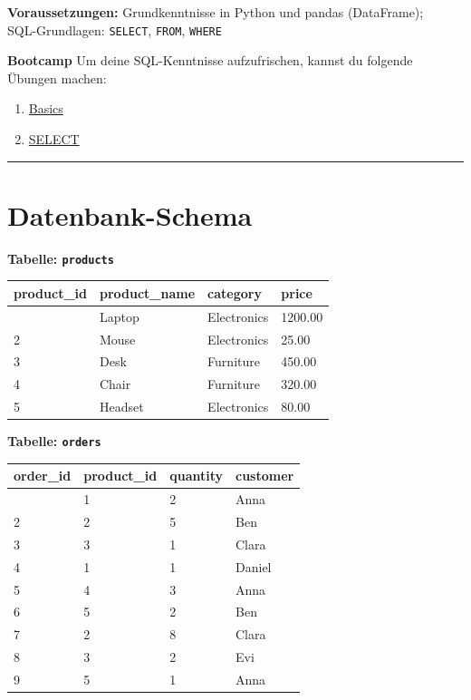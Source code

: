 \documentclass[
  nswissgerman,
  a4paper,
  DIV=11,
  numbers=noendperiod,
  ngerman]{scrreprt}
\newcounter{none} %
\providecommand{\tightlist}{%
  \setlength{\itemsep}{0pt}\setlength{\parskip}{0pt}}
\begin{document}
\textbf{Voraussetzungen:} Grundkenntnisse in Python und pandas
(DataFrame);\\
SQL-Grundlagen: \texttt{SELECT}, \texttt{FROM}, \texttt{WHERE}

\textbf{Bootcamp} Um deine SQL-Kenntnisse aufzufrischen, kannst du
folgende Übungen machen:

\begin{enumerate}
\def\labelenumi{\arabic{enumi}.}
\tightlist
\item
  \href{https://sqlzoo.net/wiki/SELECT_basics}{Basics}
\item
  \href{https://sqlzoo.net/wiki/SELECT_from_WORLD_Tutorial}{SELECT}
\end{enumerate}

\begin{center}\rule{0.5\linewidth}{0.5pt}\end{center}

\section{Datenbank-Schema}\label{datenbank-schema}

\textbf{Tabelle: \texttt{products}}

{\def\LTcaptype{none} %
\begin{longtable}[]{@{}llll@{}}
\toprule\noalign{}
product\_id & product\_name & category & price \\
\midrule\noalign{}
\endhead
\bottomrule\noalign{}
\endlastfoot
1 & Laptop & Electronics & 1200.00 \\
2 & Mouse & Electronics & 25.00 \\
3 & Desk & Furniture & 450.00 \\
4 & Chair & Furniture & 320.00 \\
5 & Headset & Electronics & 80.00 \\
\end{longtable}
}

\textbf{Tabelle: \texttt{orders}}

{\def\LTcaptype{none} %
\begin{longtable}[]{@{}llll@{}}
\toprule\noalign{}
order\_id & product\_id & quantity & customer \\
\midrule\noalign{}
\endhead
\bottomrule\noalign{}
\endlastfoot
1 & 1 & 2 & Anna \\
2 & 2 & 5 & Ben \\
3 & 3 & 1 & Clara \\
4 & 1 & 1 & Daniel \\
5 & 4 & 3 & Anna \\
6 & 5 & 2 & Ben \\
7 & 2 & 8 & Clara \\
8 & 3 & 2 & Evi \\
9 & 5 & 1 & Anna \\
\end{longtable}
}
\end{document}
